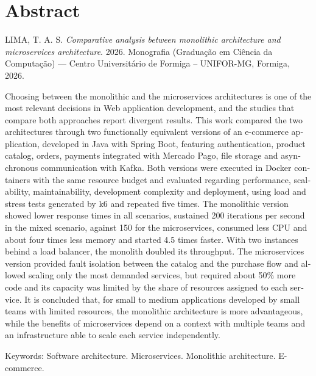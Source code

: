 \chapter*{Abstract}

\small
\noindent LIMA, T. A. S. \emph{Comparative analysis between monolithic architecture and
microservices architecture}. 2026. Monografia (Graduação em Ciência da Computação)
--- Centro Universitário de Formiga -- UNIFOR-MG, Formiga, 2026.

\normalsize \vspace{1cm} \onehalfspacing

\begin{otherlanguage}{english}
\noindent Choosing between the monolithic and the microservices architectures is one of the
most relevant decisions in Web application development, and the studies that compare both
approaches report divergent results. This work compared the two architectures through two
functionally equivalent versions of an e-commerce application, developed in Java with Spring
Boot, featuring authentication, product catalog, orders, payments integrated with Mercado Pago,
file storage and asynchronous communication with Kafka. Both versions were executed in Docker
containers with the same resource budget and evaluated regarding performance, scalability,
maintainability, development complexity and deployment, using load and stress tests generated
by k6 and repeated five times. The monolithic version showed lower response times in all
scenarios, sustained 200 iterations per second in the mixed scenario, against 150 for the
microservices, consumed less CPU and about four times less memory and started 4.5 times
faster. With two instances behind a load balancer, the monolith doubled its throughput. The
microservices version provided fault isolation between the catalog and the purchase flow and
allowed scaling only the most demanded services, but required about 50\% more code and its
capacity was limited by the share of resources assigned to each service. It is concluded that, for small to
medium applications developed by small teams with limited resources, the monolithic
architecture is more advantageous, while the benefits of microservices depend on a context with
multiple teams and an infrastructure able to scale each service independently.

\vfill%
\noindent Keywords: Software architecture. Microservices. Monolithic architecture. E-commerce.
\end{otherlanguage}
